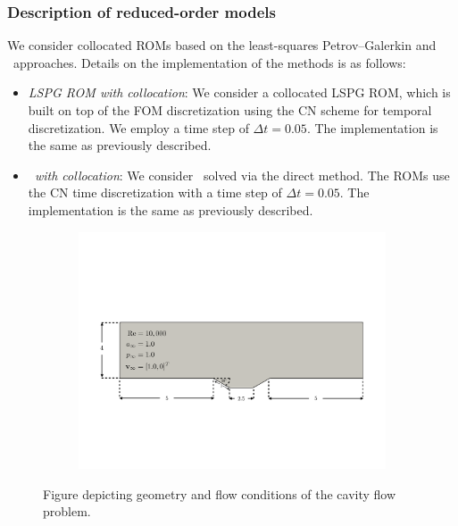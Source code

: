 \subsubsection{Description of reduced-order models}
We consider collocated ROMs based on the least-squares Petrov--Galerkin and \methodAcronym\ approaches. Details on the implementation of the methods is as follows:
\begin{itemize}

\item \textit{LSPG ROM with collocation}: We consider a collocated LSPG ROM, which is built on top of the FOM discretization using the CN scheme for temporal 
discretization. We employ a time step of $\Delta t  = 0.05$. The implementation is the same as previously described. 
 
\item \textit{\methodAcronymROMs\ with collocation}: We consider \methodAcronymROMs\ solved via the direct method. The ROMs use the CN time discretization with a time step of 
$\Delta t = 0.05$. The implementation is the same as previously described. 
\end{itemize}


\begin{figure}
\begin{center}
\begin{subfigure}[t]{0.85\textwidth}
\includegraphics[trim={2cm 5.5cm 1cm 7cm},clip,width=0.98\linewidth]{figs/cavity_new/cav_geom.pdf}
\end{subfigure}
\caption{Figure depicting geometry and flow conditions of the cavity flow problem.} 
\label{fig:cav_fig}
\end{center}
\end{figure}

